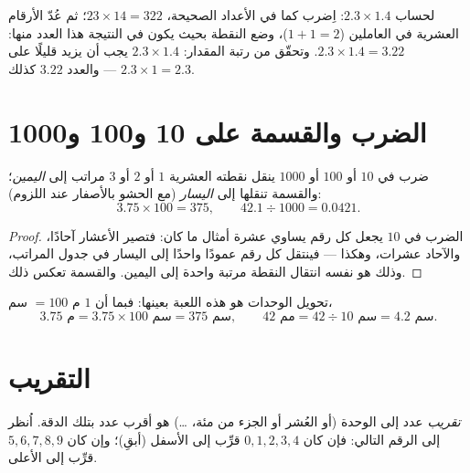 \begin{example}\label{ex:g6:decimals:mult}
لحساب $2.3 \times 1.4$: اِضرب كما في الأعداد الصحيحة،
$23 \times 14 = 322$؛ ثم عُدّ الأرقام العشرية في العاملين
($1 + 1 = 2$)، وضع النقطة بحيث يكون في النتيجة هذا العدد منها:
$2.3 \times 1.4 = 3.22$. وتحقّق من رتبة المقدار:  $2.3 \times 1.4$
يجب أن يزيد قليلًا على $2.3 \times 1 = 2.3$ --- والعدد $3.22$ كذلك.
\end{example}

\section{الضرب والقسمة على 10 و100 و1000}

\begin{proposition}\label{prop:g6:decimals:shift}
ضرب  في $10$ أو $100$ أو $1000$ ينقل نقطته
العشرية $1$ أو $2$ أو $3$ مراتب إلى \emph{اليمين}؛ والقسمة تنقلها إلى
\emph{اليسار} (مع الحشو بالأصفار عند اللزوم):
\[
3.75 \times 100 = 375, \qquad
42.1 \div 1000 = 0.0421 .
\]
\end{proposition}

\begin{proof}
الضرب في $10$ يجعل كل رقم يساوي عشرة أمثال ما كان: فتصير الأعشار
آحادًا، والآحاد عشرات، وهكذا --- فينتقل كل رقم عمودًا
واحدًا إلى اليسار في جدول المراتب، وذلك هو نفسه انتقال
النقطة مرتبة واحدة إلى اليمين. والقسمة تعكس ذلك.
\end{proof}

\begin{example}\label{ex:g6:decimals:units}
تحويل الوحدات هو هذه اللعبة بعينها: فبما أن $1$ م $= 100$ سم،
\[
3.75 \text{ م} = 3.75 \times 100 \text{ سم} = 375 \text{ سم},
\qquad
42 \text{ مم} = 42 \div 10 \text{ سم} = 4.2 \text{ سم}.
\]
\end{example}

\section{التقريب}

\begin{definition}[التقريب]\label{def:g6:decimals:rounding}
\emph{تقريب} عدد إلى الوحدة (أو العُشر أو
الجزء من مئة، \dots) هو أقرب عدد بتلك الدقة. اُنظر إلى
الرقم التالي: فإن كان $0,1,2,3,4$ قرِّب إلى الأسفل (أبقِ)؛ وإن كان
$5,6,7,8,9$ قرِّب إلى الأعلى.
\end{definition}

